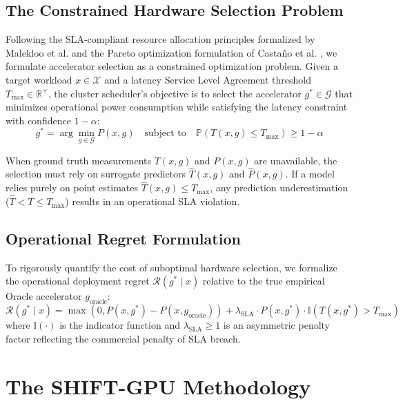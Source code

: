 \documentclass[preprint,12pt]{elsarticle}
\begin{document}
\subsection{The Constrained Hardware Selection Problem}
Following the SLA-compliant resource allocation principles formalized by Malekloo et al. \citep{suscom_malekloo2018} and the Pareto optimization formulation of Casta{\~n}o et al. \citep{suscom_multiobj2026}, we formulate accelerator selection as a constrained optimization problem. Given a target workload $x \in \mathcal{X}$ and a latency Service Level Agreement threshold $T_{\max} \in \mathbb{R}^+$, the cluster scheduler's objective is to select the accelerator $g^* \in \mathcal{G}$ that minimizes operational power consumption while satisfying the latency constraint with confidence $1 - \alpha$:
\begin{equation}
\label{eq:opt_problem}
g^* = \arg\min_{g \in \mathcal{G}} P(x, g) \quad \text{subject to} \quad \mathbb{P}\left(T(x, g) \le T_{\max}\right) \ge 1 - \alpha
\end{equation}

When ground truth measurements $T(x, g)$ and $P(x, g)$ are unavailable, the selection must rely on surrogate predictors $\hat{T}(x, g)$ and $\hat{P}(x, g)$. If a model relies purely on point estimates $\hat{T}(x, g) \le T_{\max}$, any prediction underestimation ($\hat{T} < T \le T_{\max}$) results in an operational SLA violation. 

\subsection{Operational Regret Formulation}
To rigorously quantify the cost of suboptimal hardware selection, we formalize the operational deployment regret $\mathcal{R}(g^* \mid x)$ relative to the true empirical Oracle accelerator $g_{\text{oracle}}$:
\begin{equation}
\label{eq:regret}
\mathcal{R}(g^* \mid x) = \max\left(0, P(x, g^*) - P(x, g_{\text{oracle}})\right) + \lambda_{\text{SLA}} \cdot P(x, g^*) \cdot \mathbb{I}\left(T(x, g^*) > T_{\max}\right)
\end{equation}
where $\mathbb{I}(\cdot)$ is the indicator function and $\lambda_{\text{SLA}} \ge 1$ is an asymmetric penalty factor reflecting the commercial penalty of SLA breach.

\section{The SHIFT-GPU Methodology}
\label{sec:method}
\end{document}
